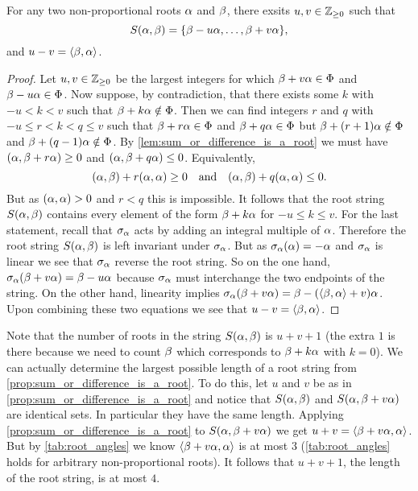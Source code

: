 \documentclass[12pt,reqno,oneside]{amsart}
\begin{document}
    \begin{proposition}\label{prop:sum_or_difference_is_a_root}
        For any two non-proportional roots $\alpha$ and $\beta$, there exsits $u,v \in \mathbb{Z}_{\ge 0}$ such that
        \[
            S(\alpha,\beta) = \{\beta-u\alpha,\ldots,\beta+v\alpha\},
        \]
        and $u-v = \langle\beta,\alpha\rangle$. 
    \end{proposition}
    \begin{proof}
        Let  $u,v \in \mathbb{Z}_{\ge 0}$ be the largest integers for which $\beta+v\alpha \in \Phi$ and $\beta-u\alpha \in \Phi$. Now suppose, by contradiction, that there exists some $k$ with $-u < k < v$ such that $\beta+k\alpha \notin \Phi$. Then we can find integers $r$ and $q$ with $-u \le r < k < q \le v$ such that $\beta+r\alpha \in \Phi$ and $\beta+q\alpha \in \Phi$ but $\beta+(r+1)\alpha \notin \Phi$ and $\beta+(q-1)\alpha \notin \Phi$. By \cref{lem:sum_or_difference_is_a_root} we must have $(\alpha,\beta+r\alpha) \ge 0$ and $(\alpha,\beta+q\alpha) \le 0$. Equivalently,
        \[
            (\alpha,\beta)+r(\alpha,\alpha) \ge 0 \quad \text{and} \quad (\alpha,\beta)+q(\alpha,\alpha) \le 0.
        \]
        But as $(\alpha,\alpha) > 0$ and $r < q$ this is impossible. It follows that the root string $S(\alpha,\beta)$ contains every element of the form $\beta+k\alpha$ for $-u \le k \le v$. For the last statement, recall that $\sigma_{\alpha}$ acts by adding an integral multiple of $\alpha$. Therefore the root string $S(\alpha,\beta)$ is left invariant under $\sigma_{\alpha}$. But as $\sigma_{\alpha}(\alpha) = -\alpha$ and $\sigma_{\alpha}$ is linear we see that $\sigma_{\alpha}$ reverse the root string. So on the one hand, $\sigma_{\alpha}(\beta+v\alpha) = \beta-u\alpha$ because $\sigma_{\alpha}$ must interchange the two endpoints of the string. On the other hand, linearity implies $\sigma_{\alpha}(\beta+v\alpha) = \beta-(\langle\beta,\alpha\rangle+v)\alpha$. Upon combining these two equations we see that $u-v = \langle\beta,\alpha\rangle$.
    \end{proof}

     Note that the number of roots in the string $S(\alpha,\beta)$ is $u+v+1$ (the extra $1$ is there because we need to count $\beta$ which corresponds to $\beta+k\alpha$ with $k = 0$). We can actually determine the largest possible length of a root string from \cref{prop:sum_or_difference_is_a_root}. To do this, let $u$ and $v$ be as in \cref{prop:sum_or_difference_is_a_root} and notice that $S(\alpha,\beta)$ and $S(\alpha,\beta+v\alpha)$ are identical sets. In particular they have the same length. Applying \cref{prop:sum_or_difference_is_a_root} to $S(\alpha,\beta+v\alpha)$ we get $u+v = \langle\beta+v\alpha,\alpha\rangle$. But by \cref{tab:root_angles} we know $\langle\beta+v\alpha,\alpha\rangle$ is at most $3$ (\cref{tab:root_angles} holds for arbitrary non-proportional roots). It follows that $u+v+1$, the length of the root string, is at most $4$.
\end{document}
